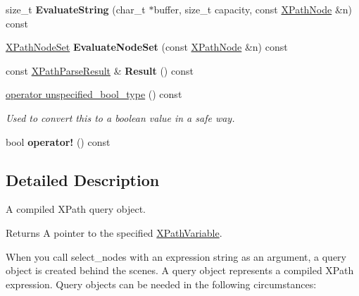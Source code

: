 \begin{DoxyCompactItemize}
\item 
\hypertarget{classphys_1_1xml_1_1XPathQuery_ac9f4705c639cbd7f3aef8266fa683cc2}{
size\_\-t {\bfseries EvaluateString} (char\_\-t $\ast$buffer, size\_\-t capacity, const \hyperlink{classphys_1_1xml_1_1XPathNode}{XPathNode} \&n) const }
\label{de/d52/classphys_1_1xml_1_1XPathQuery_ac9f4705c639cbd7f3aef8266fa683cc2}

\item 
\hypertarget{classphys_1_1xml_1_1XPathQuery_af00ba3d0346ccc01f249274947191333}{
\hyperlink{classphys_1_1xml_1_1XPathNodeSet}{XPathNodeSet} {\bfseries EvaluateNodeSet} (const \hyperlink{classphys_1_1xml_1_1XPathNode}{XPathNode} \&n) const }
\label{de/d52/classphys_1_1xml_1_1XPathQuery_af00ba3d0346ccc01f249274947191333}

\item 
\hypertarget{classphys_1_1xml_1_1XPathQuery_aa6333b52a9eb3624f21e700331d07c83}{
const \hyperlink{structphys_1_1xml_1_1XPathParseResult}{XPathParseResult} \& {\bfseries Result} () const }
\label{de/d52/classphys_1_1xml_1_1XPathQuery_aa6333b52a9eb3624f21e700331d07c83}

\item 
\hyperlink{classphys_1_1xml_1_1XPathQuery_a783704bb9a83379b6c8dadbfb5a835ce}{operator unspecified\_\-bool\_\-type} () const 
\begin{DoxyCompactList}\small\item\em Used to convert this to a boolean value in a safe way. \item\end{DoxyCompactList}\item 
\hypertarget{classphys_1_1xml_1_1XPathQuery_a6dc902dc41beff8cf60e978fa2dc8861}{
bool {\bfseries operator!} () const }
\label{de/d52/classphys_1_1xml_1_1XPathQuery_a6dc902dc41beff8cf60e978fa2dc8861}

\end{DoxyCompactItemize}


\subsection{Detailed Description}
A compiled XPath query object. \begin{DoxyReturn}{Returns}
A pointer to the specified \hyperlink{classphys_1_1xml_1_1XPathVariable}{XPathVariable}.
\end{DoxyReturn}
When you call select\_\-nodes with an expression string as an argument, a query object is created behind the scenes. A query object represents a compiled XPath expression. Query objects can be needed in the following circumstances: \par

